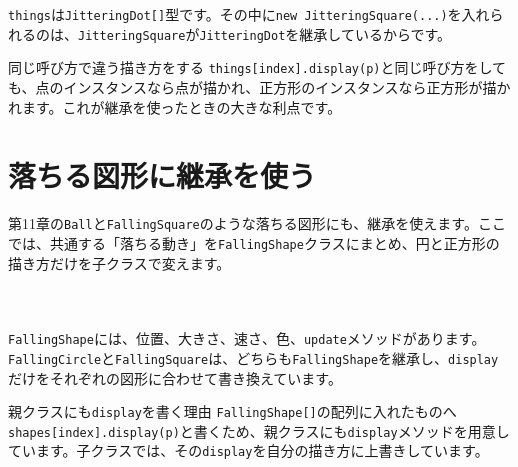 \texttt{things}は\texttt{JitteringDot[]}型です。その中に\texttt{new JitteringSquare(...)}を入れられるのは、\texttt{JitteringSquare}が\texttt{JitteringDot}を継承しているからです。

\begin{pointbox}{同じ呼び方で違う描き方をする}
\texttt{things[index].display(p)}と同じ呼び方をしても、点のインスタンスなら点が描かれ、正方形のインスタンスなら正方形が描かれます。これが継承を使ったときの大きな利点です。
\end{pointbox}

\section{落ちる図形に継承を使う}

第11章の\texttt{Ball}と\texttt{FallingSquare}のような落ちる図形にも、継承を使えます。ここでは、共通する「落ちる動き」を\texttt{FallingShape}クラスにまとめ、円と正方形の描き方だけを子クラスで変えます。

\begin{listing}[htbp]
\inputminted[firstline=1,lastline=36]{ts}{typescript-p5/listings/chapter14/falling-shapes-inheritance.ts}
\caption{落ちる図形の共通部分を表す\texttt{FallingShape}（\texttt{chapter14/falling-shapes-inheritance.ts}）}
\label{lst:chapter14-falling-shape-parent}
\end{listing}

\begin{listing}[htbp]
\inputminted[firstline=38,lastline=53]{ts}{typescript-p5/listings/chapter14/falling-shapes-inheritance.ts}
\caption{円と正方形の子クラス（\texttt{chapter14/falling-shapes-inheritance.ts}）}
\label{lst:chapter14-falling-shape-children}
\end{listing}

\begin{listing}[htbp]
\inputminted[firstline=55,lastline=84]{ts}{typescript-p5/listings/chapter14/falling-shapes-inheritance.ts}
\caption{落ちる円と正方形をまとめて動かす（\texttt{chapter14/falling-shapes-inheritance.ts}）}
\label{lst:chapter14-falling-shape-sketch}
\end{listing}

\texttt{FallingShape}には、位置、大きさ、速さ、色、\texttt{update}メソッドがあります。\texttt{FallingCircle}と\texttt{FallingSquare}は、どちらも\texttt{FallingShape}を継承し、\texttt{display}だけをそれぞれの図形に合わせて書き換えています。

\begin{notebox}{親クラスにも\texttt{display}を書く理由}
\texttt{FallingShape[]}の配列に入れたものへ\texttt{shapes[index].display(p)}と書くため、親クラスにも\texttt{display}メソッドを用意しています。子クラスでは、その\texttt{display}を自分の描き方に上書きしています。
\end{notebox}

